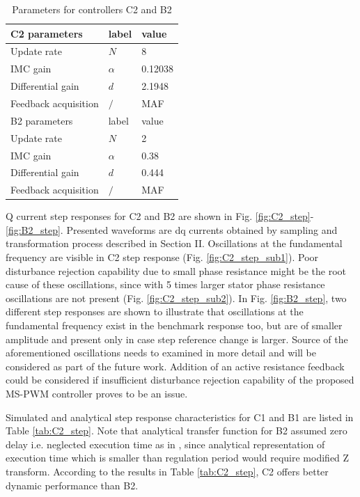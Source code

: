\documentclass[journal]{IEEEtran}
\begin{document}
\begin{table}[h!]
			  \caption{Parameters for controllers C2 and B2}
              \label{tab: case 2}
              \centering
              \begin{tabular}{lll}
                           \midrule\midrule
        C2 parameters     & label           & value\\
        \midrule               
                  Update rate   	& $N$      & 8\\  
                  IMC gain    & $\alpha$      & 0.12038    \\
                  Differential gain    & $d$      & 2.1948    \\
                  Feedback acquisition    & $/$      & MAF\\
                  \midrule\midrule
        B2 parameters & label           & value\\
                  \midrule
                  Update rate   	& $N$      & 2\\  
                  IMC gain    & $\alpha$      & 0.38    \\
                  Differential gain    & $d$      & 0.444    \\
                  Feedback acquisition    & $/$      & MAF\\                                                         
                  \midrule\midrule
              \end{tabular}
\end{table}

Q current step responses for C2 and B2 are shown in Fig. \ref{fig:C2_step}-\ref{fig:B2_step}. Presented waveforms are dq currents obtained by sampling and transformation process described in Section II. Oscillations at the fundamental frequency are visible in C2 step response (Fig. \ref{fig:C2_step_sub1}). Poor disturbance rejection capability due to small phase resistance might be the root cause of these oscillations, since with 5 times larger stator phase resistance oscillations are not present (Fig. \ref{fig:C2_step_sub2}). In Fig. \ref{fig:B2_step}, two different step responses are shown to illustrate that oscillations at the fundamental frequency exist in the benchmark response too, but are of smaller amplitude and present only in case step reference change is larger.  Source of the aforementioned oscillations needs to examined in more detail and will be considered as part of the future work. Addition of an active resistance feedback  could be considered \cite{vuksa2018} if insufficient disturbance rejection capability of the proposed MS-PWM controller proves to be an issue.\par
Simulated and analytical step response characteristics for C1 and B1 are listed in Table \ref{tab:C2_step}. Note that analytical transfer function for B2 assumed zero delay i.e. neglected execution time as in \cite{vuksa2017}, since analytical representation of execution time which is smaller than regulation period would require modified Z transform. According to the results in Table \ref{tab:C2_step}, C2 offers better dynamic performance than B2. \par
\end{document}
